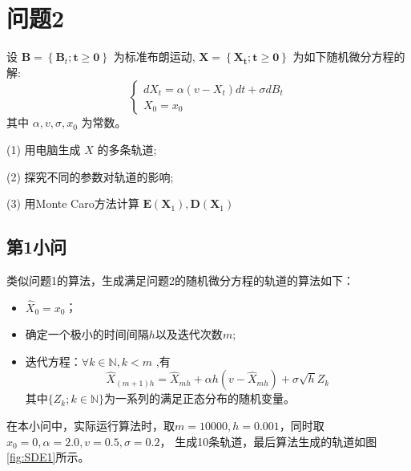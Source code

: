 \documentclass{article}
\begin{document}
\section{问题2}

\begin{mdframed} [%
	roundcorner=5pt,
	linecolor=gray!50,
	outerlinewidth=0.5pt,
	middlelinewidth=0.3pt, backgroundcolor=gray!2,
innertopmargin=\topskip, frametitle={问题2},
frametitlefont= \bfseries,frametitlerule=true,frametitlealignment =\raggedright\noindent,
frametitlerulewidth=.5pt, frametitlebackgroundcolor=gray!2,]
设 $\boldsymbol{B}=\left\{\boldsymbol{B}_t ; \boldsymbol{t} \geq \mathbf{0}\right\}$ 为标准布朗运动, $\boldsymbol{X}=\left\{\boldsymbol{X}_{\boldsymbol{t}} ; \boldsymbol{t} \geq \mathbf{0}\right\}$ 为如下随机微分方程的解:
$$
\left\{\begin{array}{l}
d X_t=\alpha\left(v-X_t\right) d t+\sigma d B_t \\
X_0=x_0
\end{array}\right.$$
其中 $\alpha, v, \sigma, x_0$ 为常数。

(1) 用电脑生成 $X$ 的多条轨道;

(2) 探究不同的参数对轨道的影响;

(3) 用Monte Caro方法计算 $\boldsymbol{E}\left(\boldsymbol{X}_1\right), \boldsymbol{D}\left(\boldsymbol{X}_1\right)$
\end{mdframed}

\subsection{第1小问}

类似问题1的算法，生成满足问题2的随机微分方程的轨道的算法如下：

\begin{itemize}
\item $\widehat{X}_0 = x_0$；
\item 确定一个极小的时间间隔$h$以及迭代次数$m$;
\item 迭代方程：$\forall k \in \mathbb{N},k < m$ ,有
$$
\widehat{X}_{(m+1)h} = \widehat{X}_{mh} + \alpha h(v - \widehat{X}_{mh})  + \sigma \sqrt{h}Z_k
$$
其中$\{Z_k;k \in \mathbb{N}\}$为一系列的满足正态分布的随机变量。
\end{itemize}

在本小问中，实际运行算法时，取$m = 10000, h = 0.001$，同时取$x_0 = 0, \alpha = 2.0, v = 0.5, \sigma = 0.2$， 生成10条轨道，最后算法生成的轨道如图\ref{fig:SDE1}所示。
\end{document}
